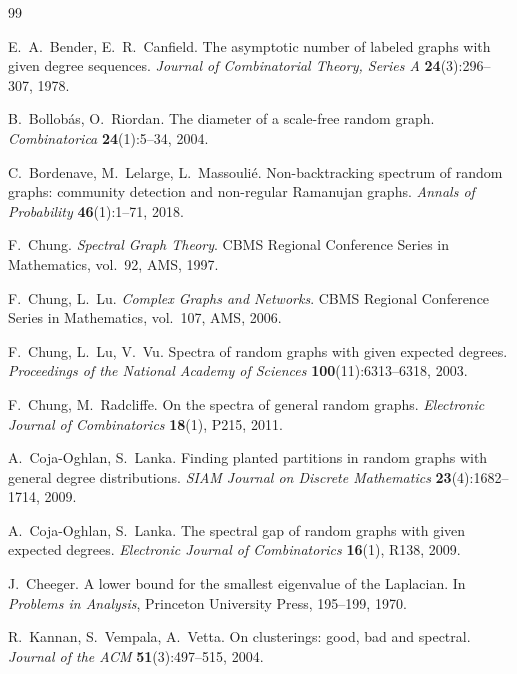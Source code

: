 \documentclass[11pt,a4paper]{article}
\theoremstyle{plain}
\theoremstyle{definition}
\theoremstyle{remark}
\begin{document}
\begin{thebibliography}{99}

E.~A.~Bender, E.~R.~Canfield.
\newblock The asymptotic number of labeled graphs with given degree sequences.
\newblock \emph{Journal of Combinatorial Theory, Series A} \textbf{24}(3):296--307, 1978.

B.~Bollob\'as, O.~Riordan.
\newblock The diameter of a scale-free random graph.
\newblock \emph{Combinatorica} \textbf{24}(1):5--34, 2004.

C.~Bordenave, M.~Lelarge, L.~Massouli\'e.
\newblock Non-backtracking spectrum of random graphs: community detection and
non-regular Ramanujan graphs.
\newblock \emph{Annals of Probability} \textbf{46}(1):1--71, 2018.

F.~Chung.
\newblock \emph{Spectral Graph Theory}.
\newblock CBMS Regional Conference Series in Mathematics, vol.~92, AMS, 1997.

F.~Chung, L.~Lu.
\newblock \emph{Complex Graphs and Networks}.
\newblock CBMS Regional Conference Series in Mathematics, vol.~107, AMS, 2006.

F.~Chung, L.~Lu, V.~Vu.
\newblock Spectra of random graphs with given expected degrees.
\newblock \emph{Proceedings of the National Academy of Sciences}
\textbf{100}(11):6313--6318, 2003.

F.~Chung, M.~Radcliffe.
\newblock On the spectra of general random graphs.
\newblock \emph{Electronic Journal of Combinatorics} \textbf{18}(1), P215, 2011.

A.~Coja-Oghlan, S.~Lanka.
\newblock Finding planted partitions in random graphs with general degree
distributions.
\newblock \emph{SIAM Journal on Discrete Mathematics} \textbf{23}(4):1682--1714, 2009.

A.~Coja-Oghlan, S.~Lanka.
\newblock The spectral gap of random graphs with given expected degrees.
\newblock \emph{Electronic Journal of Combinatorics} \textbf{16}(1), R138, 2009.

J.~Cheeger.
\newblock A lower bound for the smallest eigenvalue of the Laplacian.
\newblock In \emph{Problems in Analysis}, Princeton University Press, 195--199, 1970.

R.~Kannan, S.~Vempala, A.~Vetta.
\newblock On clusterings: good, bad and spectral.
\newblock \emph{Journal of the ACM} \textbf{51}(3):497--515, 2004.


\end{thebibliography}
\end{document}
